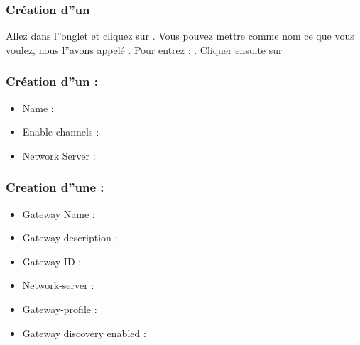 \documentclass[letterpaper,10pt,french]{sphinxmanual}
\begin{document}
\subsubsection{Création d”un }
\label{\detokenize{AnnexeA:creation-d-un-network-server}}
Allez dans l”onglet  et cliquez sur . Vous pouvez mettre comme nom ce que vous voulez, nous l”avons appelé . Pour  entrez : .
Cliquer ensuite sur 


\subsubsection{Création d”un  :}
\label{\detokenize{AnnexeA:creation-d-un-gateway-profile}}\begin{itemize}
\item {} 
Name : 

\item {} 
Enable channels : 

\item {} 
Network Server : 

\end{itemize}


\subsubsection{Creation d”une  :}
\label{\detokenize{AnnexeA:creation-d-une-gateway}}\begin{itemize}
\item {} 
Gateway Name : 

\item {} 
Gateway description : 

\item {} 
Gateway ID : 

\item {} 
Network-server : 

\item {} 
Gateway-profile : 

\item {} 
Gateway discovery enabled : 

\end{itemize}
\end{document}
